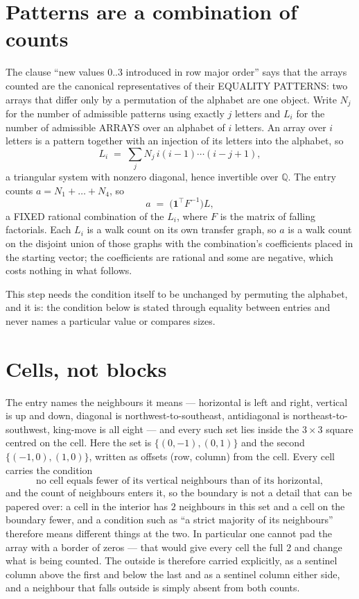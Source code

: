 \documentclass[11pt,a4paper]{article}
\theoremstyle{plain}
\theoremstyle{definition}
\begin{document}
\section{Patterns are a combination of counts}

The clause ``new values $0..3$ introduced in row major order'' says that the arrays
counted are the canonical representatives of their EQUALITY PATTERNS: two arrays that differ
only by a permutation of the alphabet are one object. Write $N_j$ for the number of admissible
patterns using exactly $j$ letters and $L_i$ for the number of admissible ARRAYS over an
alphabet of $i$ letters. An array over $i$ letters is a pattern together with an injection of
its letters into the alphabet, so
\[
L_i\;=\;\sum_{j}N_j\,i(i-1)\cdots(i-j+1),
\]
a triangular system with nonzero diagonal, hence invertible over $\mathbb{Q}$. The entry
counts $a=N_1+\dots+N_{4}$, so
\[
a\;=\;\bigl(\mathbf{1}^{\!\top}F^{-1}\bigr)L ,
\]
a FIXED rational combination of the $L_i$, where $F$ is the matrix of falling factorials.
Each $L_i$ is a walk count on its own transfer graph, so $a$ is a walk count on the disjoint
union of those graphs with the combination's coefficients placed in the starting vector; the
coefficients are rational and some are negative, which costs nothing in what follows.

This step needs the condition itself to be unchanged by permuting the alphabet, and it is:
the condition below is stated through equality between entries and never names a particular
value or compares sizes.

\section{Cells, not blocks}

The entry names the neighbours it means --- horizontal is left and right, vertical is up and
down, diagonal is northwest-to-southeast, antidiagonal is northeast-to-southwest, king-move is
all eight --- and every such set lies inside the $3\times3$ square centred on the cell. Here
the set is $\{(0,-1), (0,1)\}$ and the second $\{(-1,0), (1,0)\}$, written as offsets (row, column) from the cell. Every cell carries
the condition
\[
\text{no cell equals fewer of its vertical neighbours than of its horizontal},
\]
and the count of neighbours enters it, so the boundary is not a detail that can be papered
over: a cell in the interior has $2$ neighbours in this set and a cell on the boundary
fewer, and a condition such as ``a strict majority of its neighbours'' therefore means
different things at the two. In particular one cannot pad the array with a border of zeros ---
that would give every cell the full $2$ and change what is being counted. The outside is
therefore carried
explicitly, as a sentinel column above the first and below the last and as a sentinel column
either side, and a neighbour that falls outside is simply absent from both counts.
\end{document}
